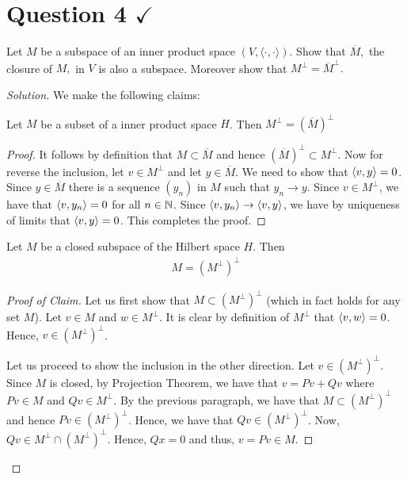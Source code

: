 \section{Question 4 \texorpdfstring{$\checkmark$}{}}
\horz
Let $M$ be a subspace of an inner product space $(V,\langle \cdot, \cdot \rangle).$ Show that $\overline{M},$ the closure of $M,$ in $V$ is also a subspace. Moreover show that $M^{\perp}= {\overline{M}}^{\perp}.$
\horz
\begin{proof}[Solution] We make the following claims:

\begin{claim}
    Let $M$ be a subset of a inner product space $H$. Then $M^{\perp} =  \left( \overline{M} \right)^{\perp}$
\end{claim}
\begin{proof}
    It follows by definition that $M \subset \overline M$ and hence $\left( \overline M \right)^{\perp} \subset M^{\perp}$. Now for reverse the inclusion, let $v \in M^{\perp}$ and let $y \in \overline M$. We need to show that $\left\langle v,y \right\rangle = 0$. Since $y\in \overline M$ there is a sequence $\left( y_{n} \right)$ in $M$ such that $y_{n} \to y$. Since $v \in M^{\perp}$, we have that $\left\langle v , y_{n} \right\rangle=0 $ for all $n\in \mathbb N$. Since $\left\langle v, y_{n} \right\rangle \to \left\langle v,y \right\rangle$, we have by uniqueness of limits that $\left\langle v,y \right\rangle = 0$. This completes the proof.
\end{proof}

\begin{claim}
    
    Let $M$ be a closed subspace of the Hilbert space $H$. Then 
    \begin{align*}
	M = \left( M^{\perp} \right) ^{\perp}
    \end{align*}
    
\label{claim:o-comp-squared}
\end{claim}
\begin{proof}[Proof of Claim]
    Let us first show that $M \subset \left( M ^{\perp} \right)^{\perp}$ (which in fact holds for any set $M$). Let $v \in M$ and $w \in M^{\perp}$. It is clear by definition of $M^{\perp}$ that $\left\langle v,w \right\rangle = 0$. Hence, $v \in \left( M^{\perp} \right)^{\perp}$.

    Let us proceed to show the inclusion in the other direction. Let $v \in \left( M^{\perp} \right)^{\perp}$. Since $M$ is closed, by Projection Theorem, we have that $v = Pv + Qv$ where $Pv \in M$ and $Qv \in M^{\perp}$. By the previous paragraph, we have that $M \subset \left( M^{\perp} \right)^{\perp}$ and hence $Pv \in \left( M^{\perp} \right) ^{\perp}$. Hence, we have that $Qv \in \left( M^{\perp} \right)^{\perp}$. Now, $Qv \in M^{\perp} \cap \left( M^{\perp} \right) ^{\perp}$. Hence, $Qx = 0$ and thus, $v=Pv \in M$.
\end{proof}


\end{proof}
